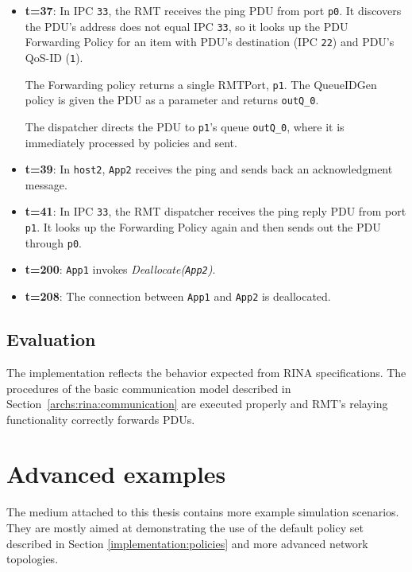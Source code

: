 \begin{itemize}
            \item \textbf{t=37}: In IPC \texttt{33}, the RMT receives the ping PDU from port \texttt{p0}. It discovers the PDU's address does not equal IPC \texttt{33}, so it looks up the PDU Forwarding Policy for an item with PDU's destination (IPC \texttt{22}) and PDU's QoS-ID (\texttt{1}).

            The Forwarding policy returns a single RMTPort, \texttt{p1}. The QueueIDGen policy is given the PDU as a parameter and returns \texttt{outQ\_0}.

            The dispatcher directs the PDU to \texttt{p1}'s queue \texttt{outQ\_0}, where it is immediately processed by policies and sent.

            \item \textbf{t=39}: In \texttt{host2}, \texttt{App2} receives the ping and sends back an acknowledgment message.

            \item \textbf{t=41}: In IPC \texttt{33}, the RMT dispatcher receives the ping reply PDU from port \texttt{p1}. It looks up the Forwarding Policy again and then sends out the PDU through \texttt{p0}.

            \item \textbf{t=200}: \texttt{App1} invokes \emph{Deallocate(\texttt{App2})}.

            \item \textbf{t=208}: The connection between \texttt{App1} and \texttt{App2} is deallocated.
            \end{itemize}

        \subsection{Evaluation}

            The implementation reflects the behavior expected from RINA specifications. The procedures of the basic communication model described in Section~\ref{archs:rina:communication} are executed properly and RMT's relaying functionality correctly forwards PDUs.


    \section{Advanced examples}

        The medium attached to this thesis contains more example simulation scenarios. They are mostly aimed at demonstrating the use of the default policy set described in Section \ref{implementation:policies} and more advanced network topologies.


